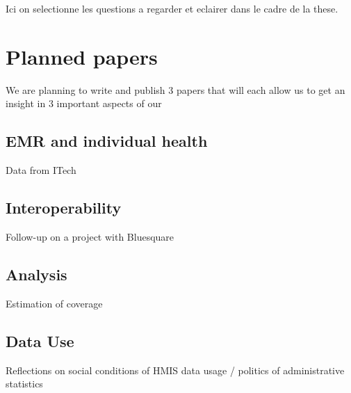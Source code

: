 \documentclass[a4paper,11pt,final,twoside]{article}
\begin{document}
Ici on selectionne les questions a regarder et eclairer dans le cadre de la these.

\section{Planned papers}

We are planning to write and publish 3 papers that will each allow us to get an insight in 3 important aspects of our 

	\subsection{EMR and individual health}

Data from ITech

	\subsection{Interoperability }
 
Follow-up on a project with Bluesquare 
 
	\subsection{Analysis}  
  
Estimation of coverage 

	\subsection{Data Use}
  
Reflections on social conditions of HMIS data usage  / politics of administrative statistics
  
\newpage

\end{document}
